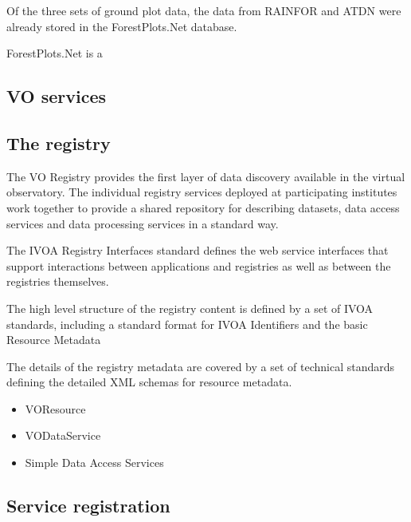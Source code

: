 \documentclass{article}
\begin{document}
Of the three sets of ground plot data, 
the data from RAINFOR and ATDN
were already stored
in the ForestPlots.Net
database.


ForestPlots.Net
is a 





\subsection{VO services}


\subsection{The registry}

The VO Registry provides the first layer of data discovery available in the
virtual observatory. The individual registry services deployed at participating
institutes work together to provide a shared repository for describing datasets,
data access services and data processing services in a standard way.

The IVOA Registry Interfaces standard
defines the web service interfaces that support interactions between
applications and registries as well as between the registries themselves.

The high level structure of the registry content is defined by a
set of IVOA standards, including a standard format for IVOA Identifiers
and the basic Resource Metadata

The details of the registry metadata are covered by a set of technical
standards defining the detailed XML schemas for resource metadata.
\begin{itemize}
  \item VOResource
  \item VODataService
  \item Simple Data Access Services
\end{itemize}




\subsection{Service registration}
\end{document}
